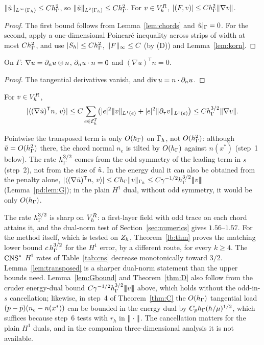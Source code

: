 \begin{lemma}[Extension]\label{lem:ext}
$\lVert \tilde u\rVert_{L^\infty(\Gamma_h)}\le Ch_\Gamma^2$, so $\lVert \tilde u\rVert_{L^2(\Gamma_h)}\le Ch_\Gamma^2$. For $v\in V_h^R$, $|(F,v)|\le Ch_\Gamma^2\lVert \nabla v\rVert$.
\end{lemma}

\begin{proof}
The first bound follows from Lemma~\ref{lem:chords} and $\tilde u|_\Gamma=0$. For the second, apply a one-dimensional Poincar\'e inequality across strips of width at most $Ch_\Gamma^2$, and use $|S_h|\le Ch_\Gamma^2$, $\lVert F\rVert_\infty\le C$ (by (D)) and Lemma~\ref{lem:korn}.
\end{proof}

\begin{lemma}\label{lem:wall}
On $\Gamma$: $\nabla u=\partial_n u\otimes n$, $\partial_n u\cdot n=0$ and $(\nabla u)^{\mathsf T}n=0$.
\end{lemma}

\begin{proof}
The tangential derivatives vanish, and $\operatorname{div} u=n\cdot\partial_n u$.
\end{proof}

\begin{lemma}\label{lem:transposed}
For $v\in V_h^R$,
\[
|\langle (\nabla\tilde u)^{\mathsf T}n,\, v\rangle|\le C\sum_{e\in\mathcal E_h^\Gamma}\bigl(|e|^2\lVert v\rVert_{L^1(e)}+|e|^2\lVert \partial_\tau v\rVert_{L^1(e)}\bigr)\le Ch_\Gamma^{3/2}\lVert \nabla v\rVert.
\]
\end{lemma}

Pointwise the transposed term is only $O(h_\Gamma)$ on $\Gamma_h$, not $O(h_\Gamma^2)$: although $\tilde u=O(h_\Gamma^2)$ there, the chord normal $n_e$ is tilted by $O(h_\Gamma)$ against $n(x^\ast)$ (step~1 below). The rate $h_\Gamma^{3/2}$ comes from the odd symmetry of the leading term in $s$ (step~2), not from the size of $\tilde u$. In the energy dual it can also be obtained from the penalty alone, $|\langle (\nabla\tilde u)^{\mathsf T}n,\, v\rangle|\le Ch_\Gamma\lVert v\rVert_{\Gamma_h}\le C\gamma^{-1/2}h_\Gamma^{3/2}|\!|\!|v|\!|\!|$ (Lemma~\ref{pd:lem:G}); in the plain $H^1$ dual, without odd symmetry, it would be only $O(h_\Gamma)$.

The rate $h_\Gamma^{3/2}$ is sharp on $V_h^R$: a first-layer field with odd trace on each chord attains it, and the dual-norm test of Section~\ref{sec:numerics} gives $1.56$--$1.57$. For the method itself, which is tested on $Z_h$, Theorem~\ref{lb:thm} proves the matching lower bound $c\,h_\Gamma^{3/2}$ for the $H^1$ error, by a different route, for every $k\ge4$. The $\mathrm{CNS}^\ast$ $H^1$ rates of Table~\ref{tab:cns} decrease monotonically toward $3/2$. Lemma~\ref{lem:transposed} is a sharper dual-norm statement than the upper bounds need. Lemma~\ref{lem:Gbound} and Theorem~\ref{thm:D} also follow from the cruder energy-dual bound $C\gamma^{-1/2}h_\Gamma^{3/2}|\!|\!|v|\!|\!|$ above, which holds without the odd-in-$s$ cancellation; likewise, in step~4 of Theorem~\ref{thm:C} the $O(h_\Gamma)$ tangential load $(p-\bar p)(n_e-n(x^\ast))$ can be bounded in the energy dual by $C_ph_\Gamma(h/\mu)^{1/2}$, which suffices because step~6 tests with $r_h$ in $|\!|\!|\cdot|\!|\!|$. The cancellation matters for the plain $H^1$ duals, and in the companion three-dimensional analysis \cite{PadhiThreeD} it is not available.

